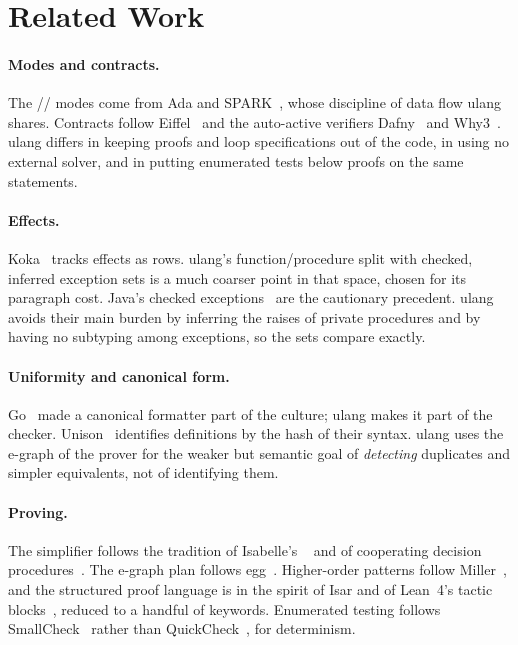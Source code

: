 \documentclass[11pt,a4paper]{article}
\newcommand{\code}[1]{\texttt{\detokenize{#1}}}
\begin{document}
\section{Related Work}\label{sec:related}

\paragraph{Modes and contracts.}
The \code{in}/\code{out}/\code{ref} modes come from Ada and SPARK~\cite{barnes2003spark},
whose discipline of data flow ulang shares. Contracts follow Eiffel~\cite{meyer1997oosc} and
the auto-active verifiers Dafny~\cite{leino2010dafny} and Why3~\cite{filliatre2013why3}.
ulang differs in keeping proofs and loop specifications out of the code, in using no external
solver, and in putting enumerated tests below proofs on the same statements.

\paragraph{Effects.}
Koka~\cite{leijen2014koka} tracks effects as rows. ulang's function/procedure split with
checked, inferred exception sets is a much coarser point in that space, chosen for its
paragraph cost. Java's checked exceptions~\cite{gosling1996} are the cautionary precedent.
ulang avoids their main burden by inferring the raises of private procedures and by having no
subtyping among exceptions, so the sets compare exactly.

\paragraph{Uniformity and canonical form.}
Go~\cite{donovan2015go} made a canonical formatter part of the culture; ulang makes it part
of the checker. Unison~\cite{unison} identifies definitions by the hash of their syntax. ulang
uses the e-graph of the prover for the weaker but semantic goal of \emph{detecting}
duplicates and simpler equivalents, not of identifying them.

\paragraph{Proving.}
The simplifier follows the tradition of Isabelle's \code{simp}~\cite{nipkow2002isabelle} and
of cooperating decision procedures~\cite{nelson1979,shostak1984,conchon2008ccx}. The e-graph
plan follows egg~\cite{willsey2021egg}. Higher-order patterns follow Miller~\cite{miller1991},
and the structured proof language is in the spirit of Isar and of Lean~4's tactic
blocks~\cite{demoura2021lean4}, reduced to a handful of keywords. Enumerated testing follows
SmallCheck~\cite{runciman2008smallcheck} rather than QuickCheck~\cite{claessen2000quickcheck},
for determinism.
\end{document}
